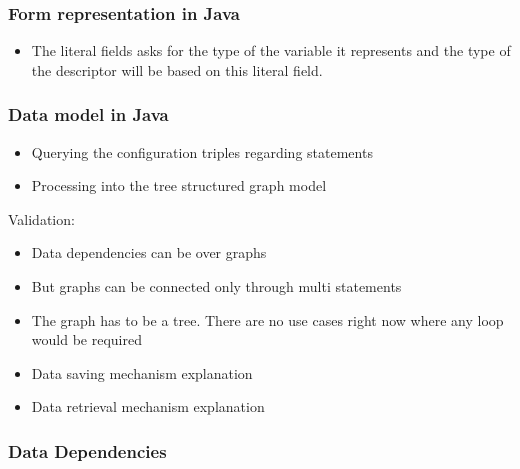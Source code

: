 \subsubsection{Form representation in Java}


\begin{itemize}
	\item The literal fields asks for the type of the variable it represents and the type of the descriptor will be based on this literal field.
\end{itemize}



\subsubsection{Data model in Java}


\begin{itemize}
	\item Querying the configuration triples regarding statements
	\item Processing into the tree structured graph model
\end{itemize}



Validation:

\begin{itemize}
	\item Data dependencies can be over graphs
	\item But graphs can be connected only through multi statements
	\item The graph has to be a tree. There are no use cases right now where any loop would be required
\end{itemize}


\begin{itemize}
	\item Data saving mechanism explanation
	\item Data retrieval mechanism explanation
\end{itemize}

\subsubsection{Data Dependencies}


